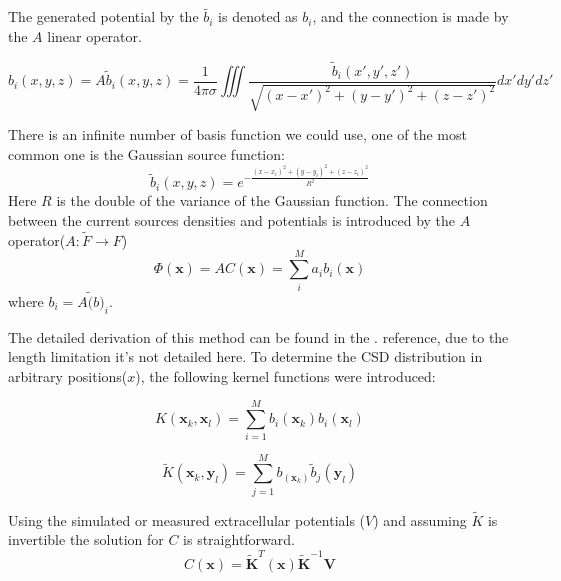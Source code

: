 \documentclass[12pt,a4paper]{article}
\begin{document}
The generated potential by the $\tilde{b_i}$ is denoted as  $b_i$, and the connection is made by the $A$ linear operator.

\begin{equation}
b_i (x,y,z)= A \tilde{b}_i (x,y,z)= \frac{1}{4 \pi \sigma} \iiint 
\frac{ \tilde{b}_i (x',y',z')}{\sqrt{(x-x')^2+(y-y')^2+(z-z')^2}} dx' dy' dz'
\end{equation}

There is an infinite number of basis function we could use, one of the most common one is the Gaussian source function:
\begin{equation}
\tilde{b}_i (x,y,z) = e^{- \frac{(x-x_i)^2+(y-y_i)^2+(z-z_i)^2}{R^2}}
\end{equation}
Here $R$ is the double of the variance of the Gaussian function. The connection between the current sources densities and potentials is introduced by the $A$ operator($A: \tilde{F}\rightarrow F$)
\begin{equation}
\Phi(\textbf{x})= A C(\textbf{x}) =  \sum_{i}^M a_i b_i (\textbf{x})
\end{equation}
 where $b_i = A \tilde(b)_i$.
 
 
 
 
 
The detailed derivation of this method can be found in the \cite{DanielW}. reference, due to the length limitation it's not detailed here.
To determine the CSD distribution in arbitrary positions($x$), the following kernel functions were introduced:

\begin{equation}
K(\textbf{x}_k,\textbf{x}_l)= \sum_{i=1}^M b_i (\textbf{x}_k) b_i (\textbf{x}_l)
\end{equation} 
 
\begin{equation}
\tilde{K}(\textbf{x}_k,\textbf{y}_l)= \sum_{j=1}^M b_ (\textbf{x}_k) \tilde{b}_j (\textbf{y}_l) 
\end{equation} 
 
Using the simulated or measured extracellular potentials ($V$) and assuming $\tilde{K}$ is invertible the solution for $C$ is straightforward.
 \begin{equation}
 C(\textbf{x})=\tilde{\textbf{K}}^T(\textbf{x})  
 \tilde{\textbf{K}}^{-1} \textbf{V}
 \end{equation}
\end{document}
